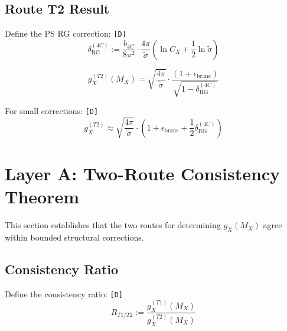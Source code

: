 \documentclass[11pt,a4paper]{article}
\newcommand{\tagD}{\textcolor{green!50!black}{\texttt{[D]}}}
\theoremstyle{definition}
\begin{document}
\subsection{Route T2 Result}
\label{subsec:route-t2-result}

Define the PS RG correction: \tagD{}
\begin{equation}
\label{eq:ps-rg-correction}
\delta_{\text{RG}}^{(4C)} := \frac{b_{4C}}{8\pi^2} \cdot \frac{4\pi}{\tilde{\sigma}} \left(\ln C_X + \frac{1}{2}\ln\tilde{\sigma}\right)
\end{equation}

\begin{derivbox}
\begin{equation}
\label{eq:gx-route-t2-boxed}
\boxed{g_X^{(T2)}(M_X) = \sqrt{\frac{4\pi}{\tilde{\sigma}}} \cdot \frac{(1 + \epsilon_{\text{brane}})}{\sqrt{1 - \delta_{\text{RG}}^{(4C)}}}}
\end{equation}

For small corrections: \tagD{}
\begin{equation}
\label{eq:gx-route-t2-expanded}
g_X^{(T2)} \approx \sqrt{\frac{4\pi}{\tilde{\sigma}}} \cdot \left(1 + \epsilon_{\text{brane}} + \frac{1}{2}\delta_{\text{RG}}^{(4C)}\right)
\end{equation}
\end{derivbox}

\section{Layer A: Two-Route Consistency Theorem}
\label{sec:two-route-consistency}

\begin{consistencybox}
This section establishes that the two routes for determining $g_X(M_X)$
agree within bounded structural corrections.
\end{consistencybox}

\subsection{Consistency Ratio}
\label{subsec:consistency-ratio}

Define the consistency ratio: \tagD{}
\begin{equation}
\label{eq:consistency-ratio-def}
R_{T1/T2} := \frac{g_X^{(T1)}(M_X)}{g_X^{(T2)}(M_X)}
\end{equation}
\end{document}
